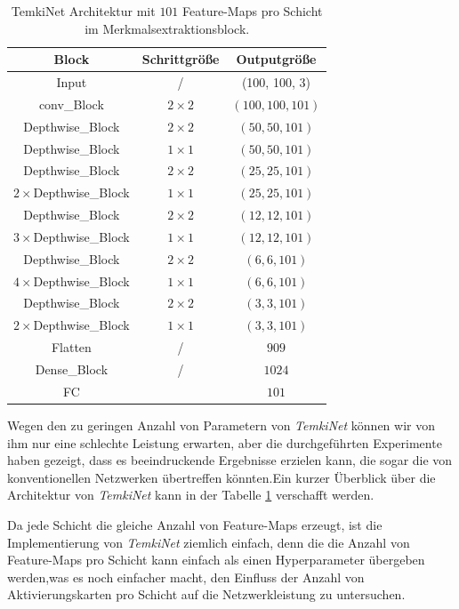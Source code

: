 \documentclass[12pt,a4paper]{scrartcl}
\numberwithin{equation}{section}
\begin{document}
\begin{table}[h!]
	\centering
	\begin{tabular}{|c|c|c|}
		\hline
		Block & Schrittgröße & Outputgröße\\ \hline
		Input & / & (100, 100, 3) \\ \hline
		conv\_Block &	$ 2\times2 $ &$ (100,100, 101) $\\ \hline
		Depthwise\_Block  & $ 2\times2 $&$ (50,50, 101) $\\ \hline
		Depthwise\_Block & $ 1\times1 $&$ (50,50, 101) $\\ \hline
		
		Depthwise\_Block  & $ 2\times2 $&$ (25,25, 101) $\\ \hline
		$ 2\times $Depthwise\_Block  & $ 1\times1 $&$ (25,25, 101) $\\ \hline
		
		Depthwise\_Block  & $ 2\times2 $&$ (12,12, 101) $\\ \hline
		$ 3\times $Depthwise\_Block  & $ 1\times1 $&$ (12,12, 101) $\\ \hline
		
		Depthwise\_Block  & $ 2\times2 $&$ (6,6, 101) $\\ \hline
		$ 4\times $Depthwise\_Block  & $ 1\times1 $&$ (6,6, 101) $\\ \hline
		
		Depthwise\_Block  & $ 2\times2 $&$ (3,3, 101) $\\ \hline
		$ 2\times $Depthwise\_Block & $ 1\times1 $&$ (3,3, 101) $\\ \hline
		Flatten & / &$ 909 $ \\ \hline
		Dense\_Block & / &$ 1024 $\\ \hline
		FC & & $ 101 $\\ \hline
		
	\end{tabular}
	\caption{TemkiNet Architektur mit $ 101 $ Feature-Maps pro Schicht im Merkmalsextraktionsblock.  }
	\label{tab:Temki_Architectur}
\end{table}
Wegen den zu geringen Anzahl von Parametern von \textit{TemkiNet} können wir von ihm nur eine schlechte Leistung erwarten, aber die durchgeführten Experimente haben gezeigt, dass es beeindruckende Ergebnisse erzielen kann, die sogar die von konventionellen Netzwerken übertreffen könnten.Ein kurzer Überblick über die Architektur von \textit{TemkiNet} kann in der Tabelle \ref{tab:Temki_Architectur} verschafft werden.

Da jede Schicht die gleiche Anzahl von Feature-Maps erzeugt, ist die Implementierung von \textit{TemkiNet} ziemlich einfach, denn die die Anzahl von Feature-Maps pro Schicht kann einfach als einen Hyperparameter übergeben werden,was es noch einfacher macht, den Einfluss der Anzahl von Aktivierungskarten pro Schicht auf die Netzwerkleistung zu untersuchen.
\end{document}
